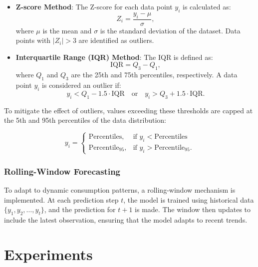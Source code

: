 \documentclass[journal]{IEEEtran}
\begin{document}
\begin{itemize}
    \item \textbf{Z-score Method}: The Z-score for each data point \(y_{i}\) is calculated as:
    \begin{equation}
    Z_{i}=\frac{y_{i}-\mu}{\sigma},
    \end{equation}
    where \(\mu\) is the mean and \(\sigma\) is the standard deviation of the dataset. Data points with \(|Z_{i}|>3\) are identified as outliers.

    \item \textbf{Interquartile Range (IQR) Method}: The IQR is defined as:
    \begin{equation}
    \text{IQR}=Q_{3}-Q_{1},
    \end{equation}
    where \(Q_{1}\) and \(Q_{3}\) are the 25th and 75th percentiles, respectively. A data point \(y_{i}\) is considered an outlier if:
    \begin{equation}
    y_{i}<Q_{1}-1.5\cdot\text{IQR}\quad\text{or}\quad y_{i}>Q_{3}+1.5\cdot\text{IQR}.
    \end{equation}
\end{itemize}

To mitigate the effect of outliers, values exceeding these thresholds are capped at the 5th and 95th percentiles of the data distribution:

\begin{equation}
y_{i}=\begin{cases}\text{Percentiles},&\text{if }y_{i}<\text{Percentiles}\\ \text{Percentile}_{95},&\text{if }y_{i}>\text{Percentile}_{95}.\end{cases}
\end{equation}

\subsubsection{Rolling-Window Forecasting}
To adapt to dynamic consumption patterns, a rolling-window mechanism is implemented. At each prediction step \(t\), the model is trained using historical data \(\{y_{1},y_{2},\ldots,y_{t}\}\), and the prediction for \(t+1\) is made. The window then updates to include the latest observation, ensuring that the model adapts to recent trends.

\section{Experiments}
\end{document}
